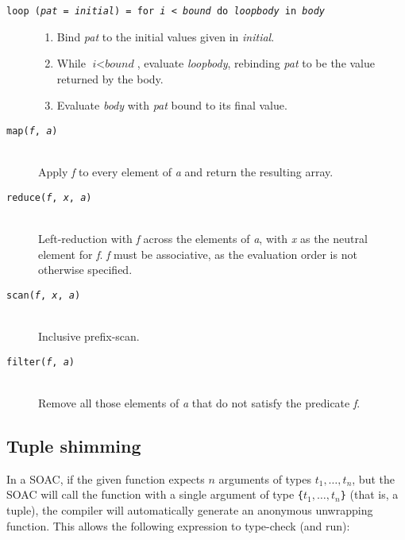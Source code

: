 \begin{description}
  \item[\texttt{loop (\textit{pat} = \textit{initial}) = for \textit{i} < \textit{bound} do \textit{loopbody} in \textit{body}}]\hfill
    \begin{enumerate}
    \item Bind \textit{pat} to the initial values given in \textit{initial}.
    \item While $\textit{i} < \textit{bound}$, evaluate \textit{loopbody},
      rebinding \textit{pat} to be the value returned by the body.
    \item Evaluate \textit{body} with \textit{pat} bound to its final
      value.
    \end{enumerate}

  \item[\texttt{map(\textit{f}, \textit{a})}]\hfill\\
    Apply \textit{f} to every element of \textit{a} and return the resulting array.

  \item[\texttt{reduce(\textit{f}, \textit{x}, \textit{a})}]\hfill\\
    Left-reduction with \textit{f} across the elements of \textit{a},
    with \textit{x} as the neutral element for \textit{f}.  \textit{f}
    must be associative, as the evaluation order is not otherwise
    specified.

  \item[\texttt{scan(\textit{f}, \textit{x}, \textit{a})}]\hfill\\
    Inclusive prefix-scan.

  \item[\texttt{filter(\textit{f}, \textit{a})}]\hfill\\
    Remove all those elements of \textit{a} that do not satisfy the
    predicate \textit{f}.

\end{description}

\subsection{Tuple shimming}

In a SOAC, if the given function expects $n$ arguments of types
$t_{1}, \ldots, t_{n}$, but the SOAC will call the function with a
single argument of type \texttt{\{$t_{1}, \ldots, t_{n}$\}} (that is,
a tuple), the \LO{} compiler will automatically generate an anonymous
unwrapping function.  This allows the following expression to
type-check (and run):

